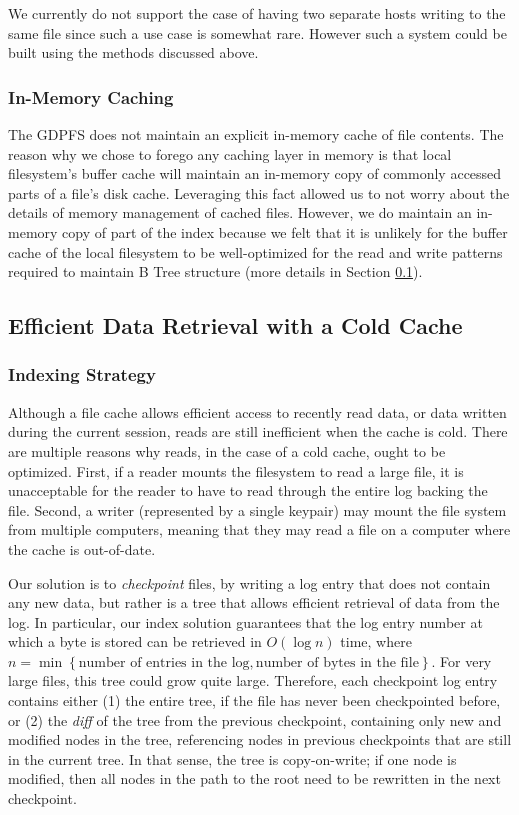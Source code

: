\documentclass{acm_proc_article-sp}
\begin{document}
We currently do not support the case of having two separate hosts writing to the same file since such a use case is somewhat rare. However such a system could be built using the methods discussed above.

\subsubsection{In-Memory Caching}
The GDPFS does not maintain an explicit in-memory cache of file contents. The reason why we chose to forego any caching layer in memory is that local filesystem's buffer cache will maintain an in-memory copy of commonly accessed parts of a file's disk cache. Leveraging this fact allowed us to not worry about the details of memory management of cached files. However, we do maintain an in-memory copy of part of the index because we felt that it is unlikely for the buffer cache of the local filesystem to be well-optimized for the read and write patterns required to maintain B Tree structure (more details in Section \ref{sec:implementation_fig_tree}).

\subsection{Efficient Data Retrieval with a Cold Cache}\label{sec:implementation_fig_tree}
\subsubsection{Indexing Strategy}
Although a file cache allows efficient access to recently read data, or data written during the current session, reads are still inefficient when the cache is cold. There are multiple reasons why reads, in the case of a cold cache, ought to be optimized. First, if a reader mounts the filesystem to read a large file, it is unacceptable for the reader to have to read through the entire log backing the file. Second, a writer (represented by a single keypair) may mount the file system from multiple computers, meaning that they may read a file on a computer where the cache is out-of-date.

Our solution is to \emph{checkpoint} files, by writing a log entry that does not contain any new data, but rather is a tree that allows efficient retrieval of data from the log. In particular, our index solution guarantees that the log entry number at which a byte is stored can be retrieved in $O(\log n)$ time, where $n = \min\left\{\text{number of entries in the log}, \text{number of bytes in the file}\right\}$. For very large files, this tree could grow quite large. Therefore, each checkpoint log entry contains either (1) the entire tree, if the file has never been checkpointed before, or (2) the \emph{diff} of the tree from the previous checkpoint, containing only new and modified nodes in the tree, referencing nodes in previous checkpoints that are still in the current tree. In that sense, the tree is copy-on-write; if one node is modified, then all nodes in the path to the root need to be rewritten in the next checkpoint.
\end{document}
